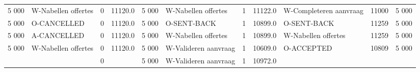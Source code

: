 \begin{tabular}{rlrlrlrllll}
5 000 & W-Nabellen offertes & 0 & 11120.0 & 5 000 & W-Nabellen offertes & 1 & 11122.0 & W-Completeren aanvraag & 11000 & 5 000 \\
5 000 & O-CANCELLED & 0 & 11120.0 & 5 000 & O-SENT-BACK & 1 & 10899.0 & O-SENT-BACK & 11259 & 5 000 \\
5 000 & A-CANCELLED & 0 & 11120.0 & 5 000 & W-Nabellen offertes & 1 & 10899.0 & W-Nabellen offertes & 11259 & 5 000 \\
5 000 & W-Nabellen offertes & 0 & 11120.0 & 5 000 & W-Valideren aanvraag & 1 & 10609.0 & O-ACCEPTED & 10809 & 5 000 \\
 &  & 0 &  & 5 000 & W-Valideren aanvraag & 1 & 10972.0 &  &  &  \\
\bottomrule
\end{tabular}
